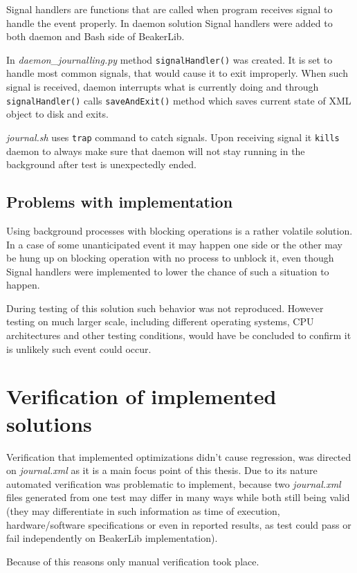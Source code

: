 Signal handlers are functions that are called when program receives signal to handle the event properly. In daemon solution Signal handlers were added to both daemon and Bash side of BeakerLib.

In \textit{daemon\_journalling.py} method \texttt{signalHandler()} was created. It is set to handle most common signals, that would cause it to exit improperly. When such signal is received, daemon interrupts what is currently doing and through \texttt{signalHandler()} calls \texttt{saveAndExit()} method which saves current state of XML object to disk and exits.

\textit{journal.sh} uses \texttt{trap} command to catch signals. Upon receiving signal it \texttt{kills} daemon to always make sure that daemon will not stay running in the background after test is unexpectedly ended.  

\subsection{Problems with implementation}
Using background processes with blocking operations is a rather volatile solution. In a case of some unanticipated event it may happen one side or the other may be hung up on blocking operation with no process to unblock it, even though Signal handlers were implemented to lower the chance of such a situation to happen.

During testing of this solution such behavior was not reproduced. However testing on much larger scale, including different operating systems, CPU architectures and other testing conditions, would have be concluded to confirm it is unlikely such event could occur. 


\section{Verification of implemented solutions}
Verification that implemented optimizations didn't cause regression, was directed on \textit{journal.xml} as it is a main focus point of this thesis. Due to its nature automated verification was problematic to implement, because two \textit{journal.xml} files generated from one test may differ in many ways while both still being valid (they may differentiate in such information as time of execution, hardware/software specifications or even in reported results, as test could pass or fail independently on BeakerLib implementation).

Because of this reasons only manual verification took place.

